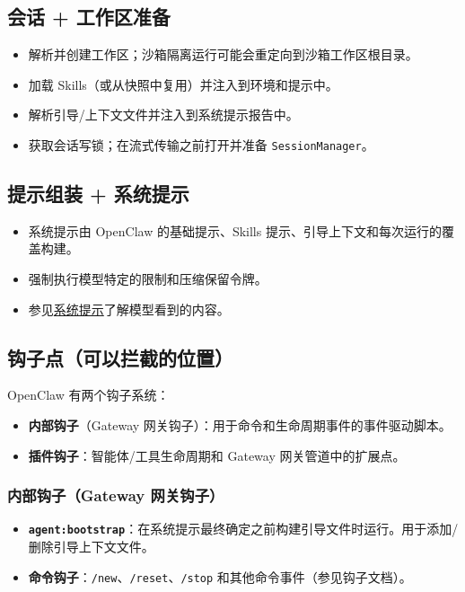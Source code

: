 \subsection{会话 + 工作区准备}


\begin{itemize}
  \item 解析并创建工作区；沙箱隔离运行可能会重定向到沙箱工作区根目录。
  \item 加载 Skills（或从快照中复用）并注入到环境和提示中。
  \item 解析引导/上下文文件并注入到系统提示报告中。
  \item 获取会话写锁；在流式传输之前打开并准备 \texttt{SessionManager}。
\end{itemize}


\subsection{提示组装 + 系统提示}


\begin{itemize}
  \item 系统提示由 OpenClaw 的基础提示、Skills 提示、引导上下文和每次运行的覆盖构建。
  \item 强制执行模型特定的限制和压缩保留令牌。
  \item 参见\href{/concepts/system-prompt}{系统提示}了解模型看到的内容。
\end{itemize}


\subsection{钩子点（可以拦截的位置）}


OpenClaw 有两个钩子系统：

\begin{itemize}
  \item \textbf{内部钩子}（Gateway 网关钩子）：用于命令和生命周期事件的事件驱动脚本。
  \item \textbf{插件钩子}：智能体/工具生命周期和 Gateway 网关管道中的扩展点。
\end{itemize}


\subsubsection{内部钩子（Gateway 网关钩子）}


\begin{itemize}
  \item \textbf{\texttt{agent:bootstrap}}：在系统提示最终确定之前构建引导文件时运行。用于添加/删除引导上下文文件。
  \item \textbf{命令钩子}：\texttt{/new}、\texttt{/reset}、\texttt{/stop} 和其他命令事件（参见钩子文档）。
\end{itemize}


